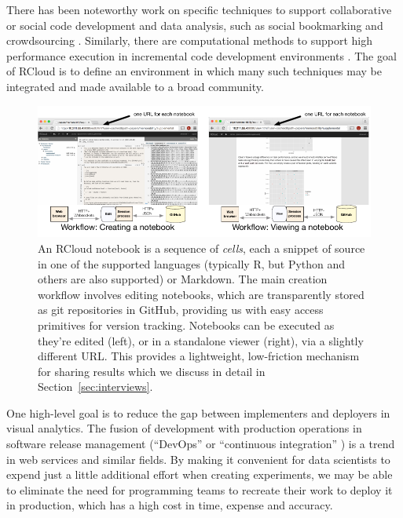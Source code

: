 There has been noteworthy work on specific techniques
to support collaborative or social code development and data analysis,
such as social bookmarking \cite{Millen:2006:DSB} \cite{Heer:2007:VAV}
and crowdsourcing \cite{Fast:2014:ECS}.
Similarly, there are computational methods to support high
performance execution in incremental code development
environments \cite{Guo:2010:TPI}.
The goal of RCloud is to define an environment in which many such
techniques may be integrated and made available to a broad community.
\begin{figure}
\centering
\includegraphics[width=.95\linewidth]{fig/notebook/notebook.pdf}
\caption{\label{fig:notebook}An RCloud notebook is a sequence of
\emph{cells}, each a snippet of source in one of the supported languages (typically R, but Python and others are also supported) or Markdown. The main creation workflow involves editing notebooks, which are transparently stored as git repositories in GitHub, providing us with easy access primitives for version tracking. Notebooks can be executed as they're edited (left), or in a standalone viewer (right), via a slightly different URL. This provides a lightweight, low-friction mechanism for sharing results which we discuss in detail in Section~\ref{sec:interviews}. }
\end{figure}

One high-level goal is to reduce the gap between implementers and
deployers in visual analytics. The fusion of development with
production operations in software release management (``DevOps''
\cite{Httermann:2012:DD} or ``continuous integration''
\cite{Fowler:2006:Continuous}) is a trend in web services and similar
fields. By making it convenient for data scientists to expend just a
little additional effort when creating experiments, we may be able to
eliminate the need for programming teams to recreate their work to
deploy it in production, which has a high cost in time, expense and
accuracy.

